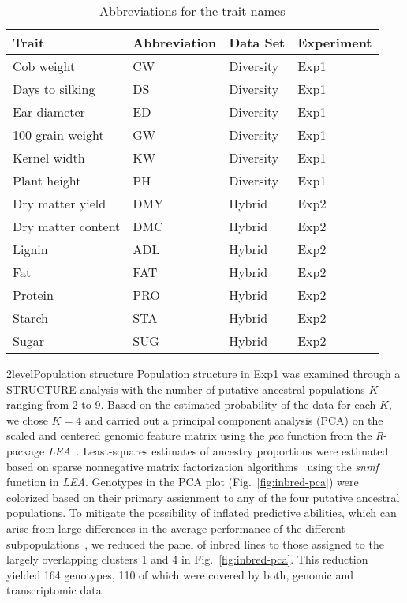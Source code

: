 \documentclass[12pt,titlepage]{article}
\begin{document}
\begin{table}[]
\centering
\caption{Abbreviations for the trait names}
\label{table:TraitKey}
\begin{tabular}{@{}llll@{}}
\toprule
Trait              & Abbreviation & Data Set  & Experiment \\ \midrule
Cob weight         & CW           & Diversity & Exp1       \\
Days to silking    & DS           & Diversity & Exp1       \\
Ear diameter       & ED           & Diversity & Exp1       \\
100-grain weight   & GW           & Diversity & Exp1       \\
Kernel width       & KW           & Diversity & Exp1       \\
Plant height       & PH           & Diversity & Exp1       \\
Dry matter yield   & DMY          & Hybrid    & Exp2       \\
Dry matter content & DMC          & Hybrid    & Exp2       \\
Lignin             & ADL          & Hybrid    & Exp2       \\
Fat                & FAT          & Hybrid    & Exp2       \\
Protein            & PRO          & Hybrid    & Exp2       \\
Starch             & STA          & Hybrid    & Exp2       \\
Sugar              & SUG          & Hybrid    & Exp2       \\ \bottomrule
\end{tabular}
\end{table}


\Genetics2level{Population structure}
Population structure in Exp1 was examined through a STRUCTURE
\cite{Pritchard2000} analysis with the number of putative ancestral
populations $K$ ranging from 2 to 9.
Based on the estimated probability of the data for each $K$, we chose $K=4$
and carried out a principal component analysis (PCA) on the scaled and centered
genomic feature matrix using the \emph{pca} function from the \emph{R}-package
\emph{LEA}~\cite{Frichot2015}.
Least-squares estimates of ancestry proportions were estimated based on sparse 
nonnegative matrix factorization algorithms~\cite{Frichot2014} using the 
\emph{snmf} function in \emph{LEA}.
Genotypes in the PCA plot (Fig.~\ref{fig:inbred-pca}) were colorized based on their
primary assignment to any of the four putative ancestral populations.
To mitigate the possibility of inflated predictive abilities, which can arise
from large differences in the average performance of the different
subpopulations~\cite{Windhausen2012}, we reduced the panel of inbred lines to
those assigned to the largely overlapping clusters 1 and 4 in
Fig.~\ref{fig:inbred-pca}.
This reduction yielded 164 genotypes, 110 of which were covered by both, genomic
and transcriptomic data.
\end{document}
